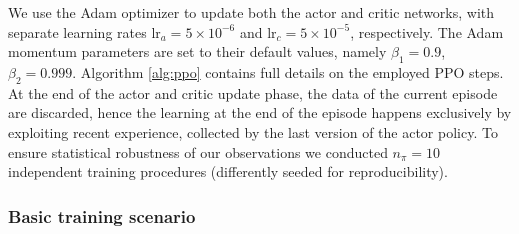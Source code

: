 We use the Adam optimizer \cite{Adam} to update both the actor and critic networks, with separate learning rates $\text{lr}_a = 5 \times 10^{-6}$ and $\text{lr}_c = 5 \times 10^{-5}$, respectively. The Adam momentum parameters are set to their default values, namely $\beta_1 = 0.9$, $\beta_2 = 0.999$. Algorithm \ref{alg:ppo} contains full details on the employed PPO steps. At the end of the actor and critic update phase, the data of the current episode are discarded, hence the learning at the end of the episode happens exclusively by exploiting recent experience, collected by the last version of the actor policy. To ensure statistical robustness of our observations we conducted $n_{\pi} = 10$ independent training procedures (differently seeded for reproducibility).
\subsubsection{Basic training scenario}
\label{sec:learning_policy_var}
